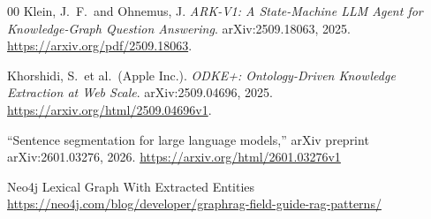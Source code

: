 \documentclass[conference]{IEEEtran}
\begin{document}
\begin{thebibliography}{00}
Klein, J.\ F.\ and Ohnemus, J.
\newblock \emph{ARK-V1: A State-Machine LLM Agent for Knowledge-Graph
Question Answering}.
\newblock arXiv:2509.18063, 2025.
\newblock \url{https://arxiv.org/pdf/2509.18063}.

Khorshidi, S.\ et al.\ (Apple Inc.).
\newblock \emph{ODKE+: Ontology-Driven Knowledge Extraction at Web Scale}.
\newblock arXiv:2509.04696, 2025.
\newblock \url{https://arxiv.org/html/2509.04696v1}.

 ``Sentence segmentation for large language models,'' arXiv preprint arXiv:2601.03276, 2026. \url{https://arxiv.org/html/2601.03276v1}

 Neo4j Lexical Graph With Extracted Entities
\url{https://neo4j.com/blog/developer/graphrag-field-guide-rag-patterns/}

\end{thebibliography}
\end{document}
